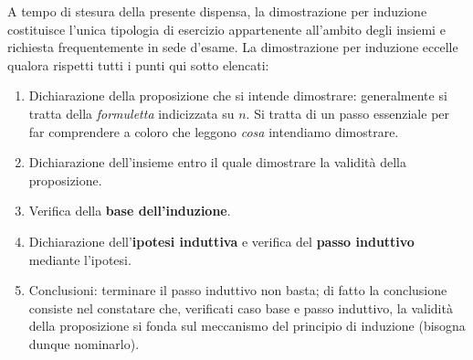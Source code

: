 \documentclass[oneside]{book}
\theoremstyle{remark}
\begin{document}
A tempo di stesura della presente dispensa, la dimostrazione per induzione
costituisce l'unica tipologia di esercizio appartenente all'ambito degli
insiemi e richiesta frequentemente in sede d'esame.
La dimostrazione per induzione eccelle qualora rispetti tutti i punti qui
sotto elencati:
\begin{enumerate}
\item Dichiarazione della proposizione che si intende dimostrare:
generalmente si tratta della \textit{formuletta} indicizzata su $n$.
Si tratta di un passo essenziale per far comprendere a coloro che
leggono \textit{cosa} intendiamo dimostrare.
\item Dichiarazione dell'insieme entro il quale dimostrare la
validità della proposizione.
\item Verifica della \textbf{base dell'induzione}.
\item Dichiarazione dell'\textbf{ipotesi induttiva} e verifica del
\textbf{passo induttivo} mediante l'ipotesi.
\item Conclusioni: terminare il passo induttivo non basta; di fatto
la conclusione consiste nel constatare che, verificati caso base e
passo induttivo, la validità della proposizione si fonda sul meccanismo
del principio di induzione (bisogna dunque nominarlo).
\end{enumerate}
\end{document}
